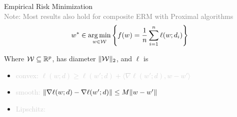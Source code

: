 \documentclass[17pt,aspectratio=169]{beamer}
\begin{document}
\begin{frame}{Empirical Risk Minimization\\[-0.6em]\footnotesize \textcolor{gray}{Note: Most results also hold for composite ERM with Proximal algorithms}}
  \vspace{-1.5em}
  \begin{align*}
    w^* \in \operatorname*{\arg\min}_{w \in \mathcal W} \left\{ f(w) = \frac 1n \sum_{i=1}^n \ell(w; d_i) \right\}
  \end{align*}

  \pause

  \vspace{0.5em}

  \small
  Where $\mathcal W \subseteq \mathbb R^p$, has diameter $\| \mathcal W \|_2$, and $\ell$ is
  \begin{itemize}
    \setlength\itemsep{0.3em}
  \item \textcolor<2,4,5,6>{lightgray}{
      convex: $\ell(w;d) \ge \ell(w';d) + \langle \nabla \ell(w';d) , w - w' \rangle$
    }
  \item \textcolor<2,3,5,6>{lightgray}{
      smooth: $\| \nabla \ell(w; d) - \nabla \ell(w'; d) \| \le M\|  w - w'  \|$
    }
    \item \textcolor<2,3,4>{lightgray}{
        Lipschitz:
      }
  \end{itemize}

  \vspace{1em}


\end{frame}

\end{document}
